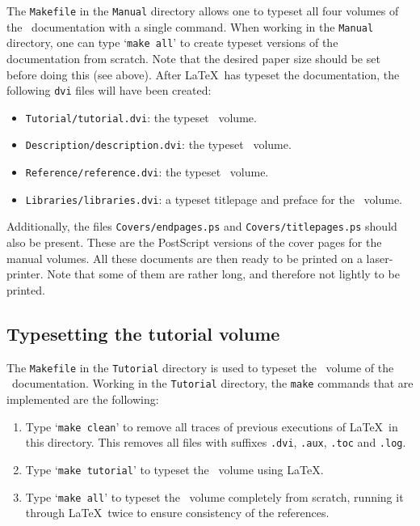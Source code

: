 \documentclass[12pt]{article}
\def\latex{{\LaTeX}}
\begin{document}
The {\tt Makefile} in the {\tt Manual} directory allows one to typeset all four
volumes of the \HOL\ documentation with a single command. When working in the
{\tt Manual} directory, one can type `{\tt make all}' to create typeset
versions of the documentation from scratch.  Note that the desired paper size
should be set before doing this (see above).  After \LaTeX\ has typeset the
documentation, the following {\tt dvi} files will have been created:

\begin{itemize}

\item {\tt Tutorial/tutorial.dvi}: the typeset \TUTORIAL\ volume.

\item {\tt Description/description.dvi}: the typeset \DESCRIPTION\ volume.

\item {\tt Reference/reference.dvi}: the typeset \REFERENCE\ volume.

\item {\tt Libraries/libraries.dvi}: a typeset titlepage and preface for the
\LIBRARIES\ volume.

\end{itemize}

\noindent Additionally, the files {\tt Covers/endpages.ps} and
{\tt Covers/titlepages.ps} should also be present.  These are the PostScript
versions of the cover pages for the manual volumes.  All these documents are
then ready to be printed on a laser-printer. Note
that some of them are rather long, and therefore not lightly to be printed.

\subsection{Typesetting the tutorial volume}

The {\tt Makefile} in the {\tt Tutorial} directory is used to typeset the
\TUTORIAL\ volume of the \HOL\ documentation.  Working in the {\tt Tutorial}
directory, the {\tt make} commands that are implemented are the following:

\begin{enumerate}

\item Type `{\tt make clean}' to remove all traces of previous executions of
\LaTeX\ in this directory.  This removes all files with suffixes {\tt .dvi},
{\tt .aux}, {\tt .toc} and {\tt .log}.

\item Type `{\tt make tutorial}' to typeset the \TUTORIAL\ volume using \latex.

\item Type `{\tt make all}' to typeset the \TUTORIAL\ volume completely from
scratch, running it through \latex\ twice to ensure consistency of the
references.

\end{enumerate}
\end{document}
